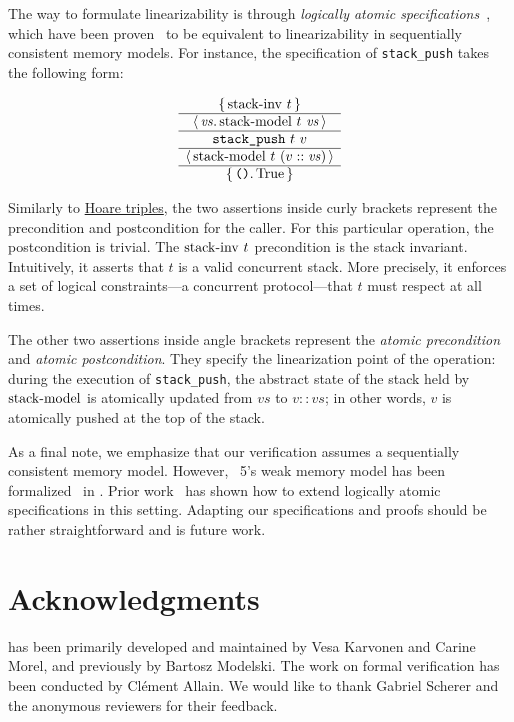 \documentclass[a4paper, 11pt]{article}
\begin{document}
The \Iris way to formulate linearizability is through \emph{logically atomic specifications}~\cite{DBLP:conf/ecoop/PintoDG14}, which have been proven~\cite{DBLP:journals/pacmpl/BirkedalDGJST21} to be equivalent to linearizability in sequentially consistent memory models.
For instance, the specification of \texttt{stack\_push} takes the following form:

\[
  \begin{array}{c} \left\lbrace\, 
    \mathrm{stack {\hbox{-}} inv}\ t
   \,\right\rbrace \\ \hline \left\langle\, 
    \mathit{vs}
   \ldotp 
    \mathrm{stack {\hbox{-}} model}\ t\  \mathit{vs}
   \,\right\rangle \\ \hline 
    \texttt{stack\_push}\ t\ v
   \\ \hline \left\langle\, 
    \mathrm{stack {\hbox{-}} model}\ t\  (v :: \mathit{vs})
   \,\right\rangle \\ \hline \left\lbrace\, 
    \texttt{()}
   \ldotp 
    \mathrm{True}
   \,\right\rbrace \end{array}
\]

Similarly to \href{https://en.wikipedia.org/wiki/Hoare_logic}{Hoare triples}, the two assertions inside curly brackets represent the precondition and postcondition for the caller.
For this particular operation, the postcondition is trivial.
The $\mathrm{stack {\hbox{-}} inv}\ t$ precondition is the stack invariant.
Intuitively, it asserts that $t$ is a valid concurrent stack.
More precisely, it enforces a set of logical constraints---a concurrent protocol---that $t$ must respect at all times.

The other two assertions inside angle brackets represent the \emph{atomic precondition} and \emph{atomic postcondition}.
They specify the linearization point of the operation: during the execution of \texttt{stack\_push}, the abstract state of the stack held by $\mathrm{stack {\hbox{-}} model}$ is atomically updated from $\mathit{vs}$ to $v :: \mathit{vs}$; in other words, $v$ is atomically pushed at the top of the stack.

As a final note, we emphasize that our verification assumes a sequentially consistent memory model.
However, \OCaml~5's weak memory model has been formalized~\cite{DBLP:journals/pacmpl/MevelJP20} in \Iris.
Prior work~\cite{DBLP:journals/pacmpl/MevelJ21} has shown how to extend logically atomic specifications in this setting.
Adapting our specifications and proofs should be rather straightforward and is future work.

\section{Acknowledgments}

\Saturn has been primarily developed and maintained by Vesa Karvonen and Carine Morel, and previously by Bartosz Modelski. The work on formal verification has been conducted by Clément Allain. We would like to thank Gabriel Scherer and the anonymous reviewers for their feedback.

\printbibliography
\end{document}
